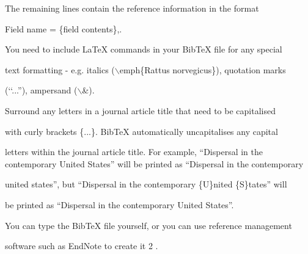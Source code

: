 \documentclass[a4paper,portrait,12pt]{article}
\begin{document}
\begin{flushleft}
The remaining lines contain the reference information in the format
\end{flushleft}


\begin{flushleft}
Field name = \{field contents\},.
\end{flushleft}


\begin{flushleft}
You need to include LaTeX commands in your BibTeX file for any special
\end{flushleft}


\begin{flushleft}
text formatting - e.g. italics (\ensuremath{\backslash}emph\{Rattus norvegicus\}), quotation marks
\end{flushleft}


\begin{flushleft}
({`}{`}...''), ampersand (\ensuremath{\backslash}\&).
\end{flushleft}


\begin{flushleft}
Surround any letters in a journal article title that need to be capitalised
\end{flushleft}


\begin{flushleft}
with curly brackets \{...\}. BibTeX automatically uncapitalises any capital
\end{flushleft}


\begin{flushleft}
letters within the journal article title. For example, {``}Dispersal in the contemporary United States'' will be printed as {``}Dispersal in the contemporary
\end{flushleft}


\begin{flushleft}
united states'', but {``}Dispersal in the contemporary \{U\}nited \{S\}tates'' will
\end{flushleft}


\begin{flushleft}
be printed as {``}Dispersal in the contemporary United States''.
\end{flushleft}


\begin{flushleft}
You can type the BibTeX file yourself, or you can use reference management
\end{flushleft}


\begin{flushleft}
software such as EndNote to create it 2 .
\end{flushleft}
\end{document}
